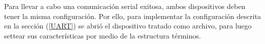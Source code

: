 Para llevar a cabo una comunicación serial exitosa, ambos dispositivos deben tener la misma configuración. Por ello, para implementar la configuración descrita en la sección (\ref{UART}) se abrió el dispositivo tratado como archivo, para luego settear sus características por medio de la estructura términos.
